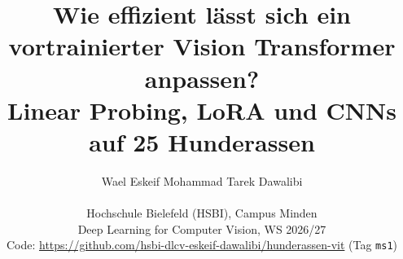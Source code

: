 \documentclass[10pt,twocolumn,letterpaper]{article}
\title{Wie effizient lässt sich ein vortrainierter Vision Transformer anpassen?\\Linear Probing, LoRA und CNNs auf 25 Hunderassen}
\author{Wael Eskeif \qquad Mohammad Tarek Dawalibi\\
{\small\matrline}\\
Hochschule Bielefeld (HSBI), Campus Minden\\
{\small Deep Learning for Computer Vision, WS 2026/27}\\
{\small Code: \url{https://github.com/hsbi-dlcv-eskeif-dawalibi/hunderassen-vit} (Tag \texttt{ms1})}
}
\begin{document}
\raggedbottom
\maketitle






{
    \small
    
}


\end{document}
